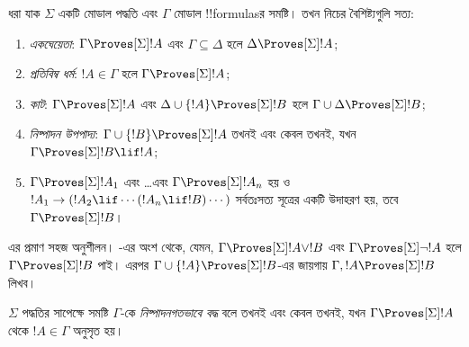 \documentclass[../../../include/open-logic-section]{subfiles}
\begin{document}


\begin{prop}
  ধরা যাক $\Sigma$ একটি মোডাল পদ্ধতি এবং $\Gamma$ মোডাল !!{formula}sর সমষ্টি। তখন নিচের বৈশিষ্ট্যগুলি সত্য:
  \begin{enumerate}
  \item{} \emph{একঘেয়েতা}: $\Gamma \Proves[\Sigma] !A$ এবং $\Gamma \subseteq \Delta$ হলে $\Delta \Proves[\Sigma] !A$;
  \item{}
    \emph{প্রতিবিম্ব ধর্ম}: $!A \in \Gamma$ হলে $\Gamma \Proves[\Sigma] !A$;
  \item{} \emph{কাট}: $\Gamma \Proves[\Sigma] !A$ এবং $\Delta \cup \{!A\} \Proves[\Sigma] !B$ হলে $\Gamma \cup \Delta \Proves[\Sigma] !B$;
  \item{} \emph{নিষ্পাদন উপপাদ্য}: $\Gamma \cup \{!B\} \Proves[\Sigma] !A$ তখনই এবং কেবল তখনই, যখন $\Gamma \Proves[\Sigma] !B \lif !A$;
  \item {}%
    $\Gamma \Proves[\Sigma] !A_1$ এবং \dots এবং $\Gamma
    \Proves[\Sigma] !A_n$ হয় ও $!A_1 \to (!A_2 \lif \cdots (!A_n \lif
    !B)\cdots)$ সর্বতঃসত্য সূত্রের একটি উদাহরণ হয়, তবে $\Gamma
    \Proves[\Sigma] !B$।
  \end{enumerate}
\end{prop}

এর প্রমাণ সহজ অনুশীলন। -এর  অংশ থেকে, যেমন, $\Gamma \Proves[\Sigma] !A \lor !B$ এবং $\Gamma \Proves[\Sigma] \lnot !A$ হলে $\Gamma \Proves[\Sigma] !B$ পাই। এরপর $\Gamma \cup \{ !A\} \Proves[\Sigma] !B$-এর জায়গায় $\Gamma, !A \Proves[\Sigma] !B$ লিখব।

\begin{defn}
  $\Sigma$ পদ্ধতির সাপেক্ষে সমষ্টি $\Gamma$-কে \emph{নিষ্পাদনগতভাবে বদ্ধ} বলে তখনই এবং কেবল তখনই, যখন $\Gamma \Proves[\Sigma] !A$ থেকে $!A \in \Gamma$ অনুসৃত হয়।
\end{defn}
\end{document}
